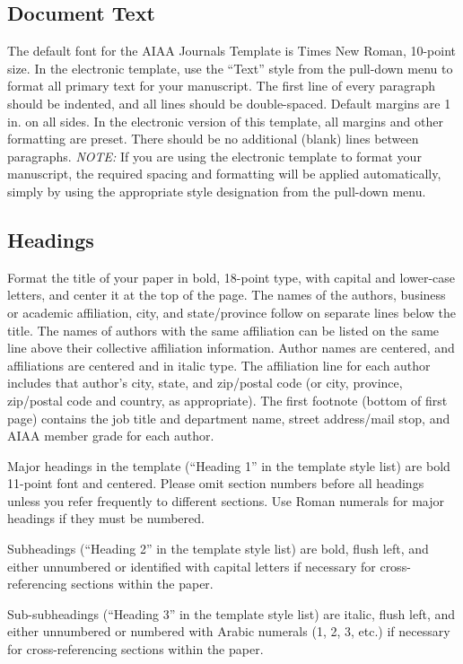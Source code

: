 \documentclass{AIAA}
\begin{document}
\subsection{Document Text}
The default font for the AIAA Journals Template is Times New Roman, 10-point size. In the electronic template, use the ``Text'' style from the pull-down menu to format all primary text for your manuscript. The first line of every paragraph should be indented, and all lines should be double-spaced. Default margins are 1 in. on all sides. In the electronic version of this template, all margins and other formatting are preset. There should be no additional (blank) lines between paragraphs.
\textit{NOTE:} If you are using the electronic template to format your manuscript, the required spacing and formatting will be applied automatically, simply by using the appropriate style designation from the pull-down menu.

\subsection{Headings}
Format the title of your paper in bold, 18-point type, with capital and lower-case letters, and center it at the top of the page. The names of the authors, business or academic affiliation, city, and state/province follow on separate lines below the title. The names of authors with the same affiliation can be listed on the same line above their collective affiliation information. Author names are centered, and affiliations are centered and in italic type. The affiliation line for each author includes that author's city, state, and zip/postal code (or city, province, zip/postal code and country, as appropriate). The first footnote (bottom of first page) contains the job title and department name, street address/mail stop, and AIAA member grade for each author.

Major headings in the template (``Heading 1'' in the template style list) are bold 11-point font and centered. Please omit section numbers before all headings unless you refer frequently to different sections. Use Roman numerals for major headings if they must be numbered.

Subheadings (``Heading 2'' in the template style list) are bold, flush left, and either unnumbered or identified with capital letters if necessary for cross-referencing sections within the paper.

Sub-subheadings (``Heading 3'' in the template style list) are italic, flush left, and either unnumbered or numbered with Arabic numerals (1, 2, 3, etc.) if necessary for cross-referencing sections within the paper.
\end{document}
